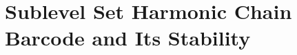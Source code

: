 \documentclass[10pt,a4paper]{amsart}
\theoremstyle{definition}
\newcommand{\fsimp}{\sigma}
\newcommand{\Bnd}{B}
\newcommand{\Cobmat}{\mathtt{Cob}}
\newcommand{\Chnmat}{\mathtt{SC}}
\newcommand{\Bndmat}{\mathtt{BoC}}
\newcommand{\aG}{\alpha}
\newcommand{\sG}{\sigma}
\newcommand{\dG}{\delta}
\newcommand{\gG}{\gamma}
\theoremstyle{remark}
\begin{document}






% 
\section{Sublevel Set Harmonic Chain Barcode and Its Stability}
\label{sec:stability}
\end{document}
